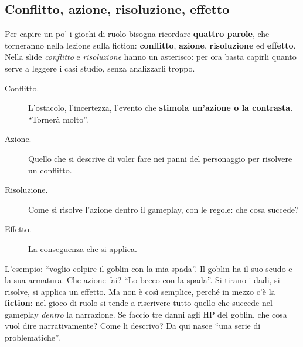 \subsection{Conflitto, azione, risoluzione, effetto}



Per capire un po' i giochi di ruolo bisogna ricordare \textbf{quattro parole},
che torneranno nella lezione sulla fiction: \textbf{conflitto}, \textbf{azione},
\textbf{risoluzione} ed \textbf{effetto}. Nella slide \emph{conflitto} e
\emph{risoluzione} hanno un asterisco: per ora basta capirli quanto serve a
leggere i casi studio, senza analizzarli troppo.
\begin{description}
  \item[Conflitto.] L'ostacolo, l'incertezza, l'evento che \textbf{stimola
        un'azione o la contrasta}. ``Tornerà molto''.
  \item[Azione.] Quello che si descrive di voler fare nei panni del personaggio
        per risolvere un conflitto.
  \item[Risoluzione.] Come si risolve l'azione dentro il gameplay, con le regole:
        che cosa succede?
  \item[Effetto.] La conseguenza che si applica.
\end{description}
L'esempio: ``voglio colpire il goblin con la mia spada''. Il goblin ha il suo
scudo e la sua armatura. Che azione fai? ``Lo becco con la spada''. Si tirano i
dadi, si risolve, si applica un effetto. Ma non è così semplice, perché in
mezzo c'è la \textbf{fiction}: nel gioco di ruolo si tende a riscrivere tutto
quello che succede nel gameplay \emph{dentro} la narrazione. Se faccio tre danni
agli HP del goblin, che cosa vuol dire narrativamente? Come li descrivo? Da qui
nasce ``una serie di problematiche''.

